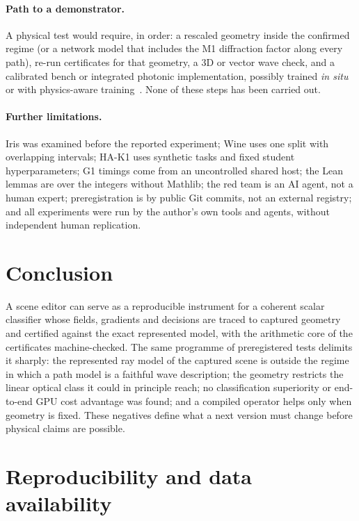 \documentclass[11pt,a4paper]{article}
\begin{document}
\paragraph{Path to a demonstrator.} A physical test would require, in order: a rescaled geometry inside the confirmed regime (or a network model that includes the M1 diffraction factor along every path), re-run certificates for that geometry, a 3D or vector wave check, and a calibrated bench or integrated photonic implementation, possibly trained \emph{in situ}~\cite{pai2023} or with physics-aware training~\cite{wright2022}. None of these steps has been carried out.

\paragraph{Further limitations.} Iris was examined before the reported experiment; Wine uses one split with overlapping intervals; HA-K1 uses synthetic tasks and fixed student hyperparameters; G1 timings come from an uncontrolled shared host; the Lean lemmas are over the integers without Mathlib; the red team is an AI agent, not a human expert; preregistration is by public Git commits, not an external registry; and all experiments were run by the author's own tools and agents, without independent human replication.

\section{Conclusion}
\label{sec:conclusion}

A scene editor can serve as a reproducible instrument for a coherent scalar classifier whose fields, gradients and decisions are traced to captured geometry and certified against the exact represented model, with the arithmetic core of the certificates machine-checked. The same programme of preregistered tests delimits it sharply: the represented ray model of the captured scene is outside the regime in which a path model is a faithful wave description; the geometry restricts the linear optical class it could in principle reach; no classification superiority or end-to-end GPU cost advantage was found; and a compiled operator helps only when geometry is fixed. These negatives define what a next version must change before physical claims are possible.

\section*{Reproducibility and data availability}
\end{document}

